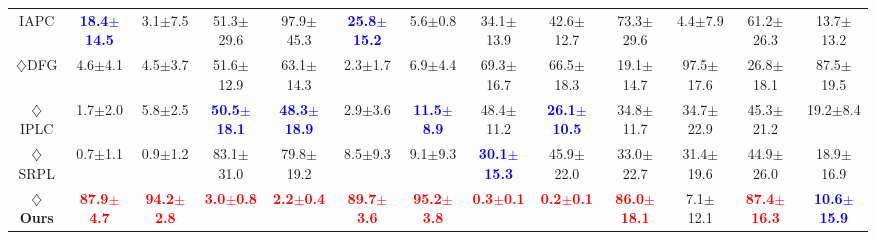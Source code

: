 \begin{table}[t]
{\begin{tabular}{@{}c@{\hspace{0.25cm}} cccc cccc @{\hspace{0.4cm}} cc cc@{}}
IAPC \cite{IAPC} & \textcolor{blue}{\textbf{18.4$\pm$14.5}} & 3.1$\pm$7.5 & 51.3$\pm$29.6 & 97.9$\pm$45.3 & \textcolor{blue}{\textbf{25.8$\pm$15.2}} & 5.6$\pm$0.8 & {34.1$\pm$13.9} & 42.6$\pm$12.7 & 73.3$\pm$29.6 & 4.4$\pm$7.9 & 61.2$\pm$26.3 & 13.7$\pm$13.2 \\
$\diamondsuit$DFG \cite{DFG} & 4.6$\pm$4.1 & 4.5$\pm$3.7 & 51.6$\pm$12.9 & 63.1$\pm$14.3 & 2.3$\pm$1.7 & 6.9$\pm$4.4 & 69.3$\pm$16.7 & 66.5$\pm$18.3 & 19.1$\pm$14.7 & 97.5$\pm$17.6 & 26.8$\pm$18.1 & 87.5$\pm$19.5 \\
$\diamondsuit$IPLC \cite{iplc} & 1.7$\pm$2.0 & 5.8$\pm$2.5 & \textcolor{blue}{\textbf{50.5$\pm$18.1}} & \textcolor{blue}{\textbf{48.3$\pm$18.9}} & 2.9$\pm$3.6 & \textcolor{blue}{\textbf{11.5$\pm$8.9}} & 48.4$\pm$11.2 & \textcolor{blue}{\textbf{26.1$\pm$10.5}} & 34.8$\pm$11.7 & 34.7$\pm$22.9 & 45.3$\pm$21.2 & 19.2$\pm$8.4 \\
$\diamondsuit$SRPL \cite{SRPL} & 0.7$\pm$1.1 & 0.9$\pm$1.2 & 83.1$\pm$31.0 & 79.8$\pm$19.2 & 8.5$\pm$9.3 & 9.1$\pm$9.3 & \textcolor{blue}{\textbf{30.1$\pm$15.3}} & 45.9$\pm$22.0 & 33.0$\pm$22.7 & 31.4$\pm$19.6 & 44.9$\pm$26.0 & 18.9$\pm$16.9 \\ 
\midrule
$\diamondsuit$\textbf{Ours} & \textcolor{red}{\textbf{87.9$\pm$4.7}} & \textcolor{red}{\textbf{94.2$\pm$2.8}} & \textcolor{red}{\textbf{3.0$\pm$0.8}} & \textcolor{red}{\textbf{2.2$\pm$0.4}} & \textcolor{red}{\textbf{89.7$\pm$3.6}} & \textcolor{red}{\textbf{95.2$\pm$3.8}} & \textcolor{red}{\textbf{0.3$\pm$0.1}} & \textcolor{red}{\textbf{0.2$\pm$0.1}}& \textcolor{red}{\textbf{86.0$\pm$18.1}} & {7.1$\pm$12.1} & \textcolor{red}{\textbf{87.4$\pm$16.3}} & \textcolor{blue}{\textbf{10.6$\pm$15.9}} \\ 
\bottomrule
\end{tabular}%
}
\vspace{-3mm}
\end{table}